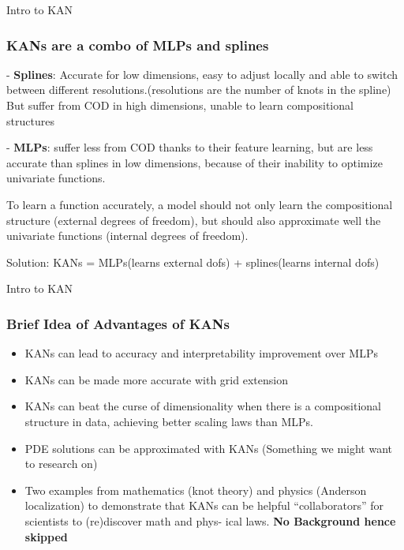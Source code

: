 \documentclass[serif, aspectratio=169]{beamer}
\begin{document}
\begin{frame}{Intro to KAN}
    \frametitle<presentation>{KANs are a combo of MLPs and splines}
    - \textbf{Splines}: Accurate for low dimensions, easy to adjust locally and able to switch between different resolutions.(resolutions are the number of knots in the spline)
    But suffer from COD in high dimensions, unable to learn compositional structures

    - \textbf{MLPs}: suffer less from COD thanks to their feature learning, but are less accurate than splines in low dimensions,
    because of their inability to optimize univariate functions.

    To learn a function accurately,
    a model should not only learn the compositional structure (external degrees of freedom), but should
    also approximate well the univariate functions (internal degrees of freedom).

    Solution: KANs = MLPs(learns external dofs) + splines(learns internal dofs)
\end{frame}
\begin{frame}{Intro to KAN}
    \frametitle<presentation>{Brief Idea of Advantages of KANs}
    \begin{itemize}
        \item KANs can lead to
              accuracy and interpretability improvement over MLPs
        \item KANs can be made more accurate with grid extension
        \item KANs can beat the curse of dimensionality when there is a compositional structure in data, achieving better scaling laws than MLPs.
        \item PDE solutions can be approximated with KANs (Something we might want to research on)
        \item Two examples from mathematics (knot theory) and physics (Anderson localization) to
              demonstrate that KANs can be helpful “collaborators” for scientists to (re)discover math and phys-
              ical laws. \textbf{No Background hence skipped}
    \end{itemize}

\end{frame}
\end{document}
